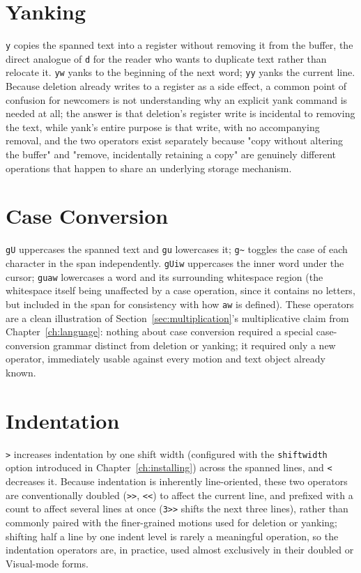 \section{Yanking}

\texttt{y} copies the spanned text into a register without removing it from the buffer, the direct analogue of \texttt{d} for the reader who wants to duplicate text rather than relocate it. \texttt{yw} yanks to the beginning of the next word; \texttt{yy} yanks the current line. Because deletion already writes to a register as a side effect, a common point of confusion for newcomers is not understanding why an explicit yank command is needed at all; the answer is that deletion's register write is incidental to removing the text, while yank's entire purpose is that write, with no accompanying removal, and the two operators exist separately because "copy without altering the buffer" and "remove, incidentally retaining a copy" are genuinely different operations that happen to share an underlying storage mechanism.

\section{Case Conversion}

\texttt{gU} uppercases the spanned text and \texttt{gu} lowercases it; \texttt{g\textasciitilde} toggles the case of each character in the span independently. \texttt{gUiw} uppercases the inner word under the cursor; \texttt{guaw} lowercases a word and its surrounding whitespace region (the whitespace itself being unaffected by a case operation, since it contains no letters, but included in the span for consistency with how \texttt{aw} is defined). These operators are a clean illustration of Section~\ref{sec:multiplication}'s multiplicative claim from Chapter~\ref{ch:language}: nothing about case conversion required a special case-conversion grammar distinct from deletion or yanking; it required only a new operator, immediately usable against every motion and text object already known.

\section{Indentation}

\texttt{>} increases indentation by one shift width (configured with the \texttt{shiftwidth} option introduced in Chapter~\ref{ch:installing}) across the spanned lines, and \texttt{<} decreases it. Because indentation is inherently line-oriented, these two operators are conventionally doubled (\texttt{>>}, \texttt{<<}) to affect the current line, and prefixed with a count to affect several lines at once (\texttt{3>>} shifts the next three lines), rather than commonly paired with the finer-grained motions used for deletion or yanking; shifting half a line by one indent level is rarely a meaningful operation, so the indentation operators are, in practice, used almost exclusively in their doubled or Visual-mode forms.

